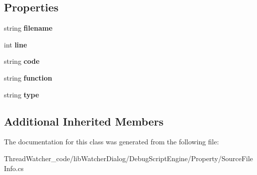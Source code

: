 \subsection*{Properties}
\begin{DoxyCompactItemize}
\item 
\hypertarget{classlib_watcher_dialog_1_1_debug_script_engine_1_1_property_1_1_source_file_info_a3816924f1b1cb9848d2a4603dc8ad5c0}{string {\bfseries filename}}\label{classlib_watcher_dialog_1_1_debug_script_engine_1_1_property_1_1_source_file_info_a3816924f1b1cb9848d2a4603dc8ad5c0}

\item 
\hypertarget{classlib_watcher_dialog_1_1_debug_script_engine_1_1_property_1_1_source_file_info_aa984f640865077bbaae1e189fe0107bf}{int {\bfseries line}}\label{classlib_watcher_dialog_1_1_debug_script_engine_1_1_property_1_1_source_file_info_aa984f640865077bbaae1e189fe0107bf}

\item 
\hypertarget{classlib_watcher_dialog_1_1_debug_script_engine_1_1_property_1_1_source_file_info_aa7dda83a58d3541cfa2d0235e0bc1449}{string {\bfseries code}}\label{classlib_watcher_dialog_1_1_debug_script_engine_1_1_property_1_1_source_file_info_aa7dda83a58d3541cfa2d0235e0bc1449}

\item 
\hypertarget{classlib_watcher_dialog_1_1_debug_script_engine_1_1_property_1_1_source_file_info_af90a8cbd9233a8b78325d4ad6c7ca31b}{string {\bfseries function}}\label{classlib_watcher_dialog_1_1_debug_script_engine_1_1_property_1_1_source_file_info_af90a8cbd9233a8b78325d4ad6c7ca31b}

\item 
\hypertarget{classlib_watcher_dialog_1_1_debug_script_engine_1_1_property_1_1_source_file_info_ad1d16f7cf91da0648467b6df21633053}{string {\bfseries type}}\label{classlib_watcher_dialog_1_1_debug_script_engine_1_1_property_1_1_source_file_info_ad1d16f7cf91da0648467b6df21633053}

\end{DoxyCompactItemize}
\subsection*{Additional Inherited Members}


The documentation for this class was generated from the following file\+:\begin{DoxyCompactItemize}
\item 
Thread\+Watcher\+\_\+code/lib\+Watcher\+Dialog/\+Debug\+Script\+Engine/\+Property/Source\+File\+Info.\+cs\end{DoxyCompactItemize}
